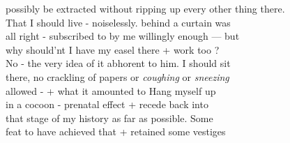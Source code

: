 \documentclass[11pt,a4paper]{article}
\begin{document}
{possibly be extracted without ripping up every other thing there. \\
That I should live - noiselessly. behind a curtain was \\
all right - subscribed to by me willingly enough --- but \\
why should'nt I have my easel there + work too ? \\
No - the very idea of it abhorent to him. I should sit \\
there, no crackling of papers or \emph{coughing} or \emph{sneezing} \\
allowed - + what it amounted to Hang myself up \\
in a cocoon - prenatal effect + recede back into \\
that stage of my history as far as possible. Some \\
feat to have achieved that + retained some vestiges}


\end{document}
